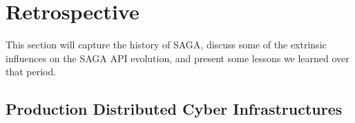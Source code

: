 \documentclass{article}
\begin{document}




\section{Retrospective}
\label{sec:retro}

 This section will capture the history of SAGA, discuss some of the extrinsic
 influences on the SAGA API evolution, and present some lessons we learned over
 that period.  


 \subsection{Production Distributed Cyber Infrastructures}
\end{document}
